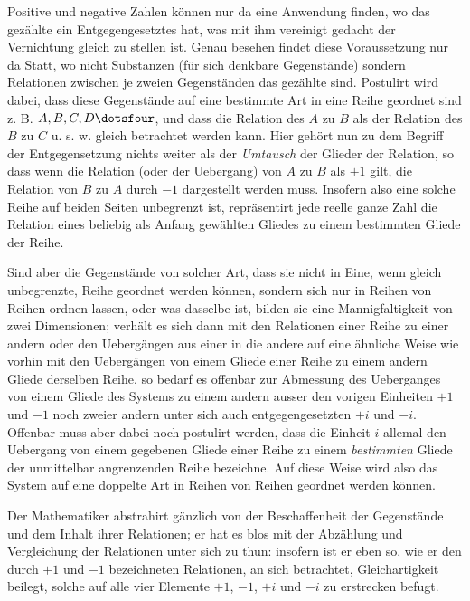 Positive und negative Zahlen können nur da eine Anwendung finden, wo
%
das gezählte ein Entgegengesetztes hat, was mit ihm vereinigt gedacht der Vernichtung gleich zu stellen ist. Genau besehen findet diese Voraussetzung nur da Statt, wo nicht Substanzen (für sich denkbare Gegenstände) sondern Relationen zwischen je zweien Gegenständen das gezählte sind. Postulirt wird dabei, dass diese Gegenstände auf eine bestimmte Art in eine Reihe geordnet sind z. B. $A,B,C,D\dotsfour$, und dass die Relation des $A$ zu $B$ als der Relation des $B$ zu $C$ u. s. w. gleich betrachtet werden kann. Hier gehört nun zu dem Begriff der Entgegensetzung nichts weiter als der \emph{Umtausch} der Glieder der Relation, so dass wenn die Relation (oder der Uebergang) von $A$ zu $B$ als $+1$ gilt, die Relation von $B$ zu $A$ durch $-1$ dargestellt werden muss. Insofern also eine solche Reihe auf beiden Seiten unbegrenzt ist, repräsentirt jede reelle ganze Zahl die Relation eines beliebig als Anfang gewählten Gliedes zu einem bestimmten Gliede der Reihe.

Sind aber die Gegenstände von solcher Art, dass sie nicht in Eine, wenn gleich unbegrenzte, Reihe geordnet werden können, sondern sich nur in Reihen von Reihen ordnen lassen, oder was dasselbe ist, bilden sie eine Mannigfaltigkeit von zwei Dimensionen; verhält es sich dann mit den Relationen einer Reihe zu einer andern oder den Uebergängen aus einer in die andere auf eine ähnliche Weise wie vorhin mit den Uebergängen von einem Gliede einer Reihe zu einem andern Gliede derselben Reihe, so bedarf es offenbar zur Abmessung des Ueberganges von einem Gliede des Systems zu einem andern ausser den vorigen Einheiten $+1$ und $-1$ noch zweier andern unter sich auch entgegengesetzten $+i$ und $-i$. Offenbar muss aber dabei noch postulirt werden, dass die Einheit $i$ allemal den Uebergang von einem gegebenen Gliede einer Reihe zu einem \emph{bestimmten} Gliede der unmittelbar angrenzenden Reihe bezeichne. Auf diese Weise wird also das System auf eine doppelte Art in Reihen von Reihen geordnet werden können.

Der Mathematiker abstrahirt gänzlich von der Beschaffenheit der Gegenstände und dem Inhalt ihrer Relationen; er hat es blos mit der Abzählung und Vergleichung der Relationen unter sich zu thun: insofern ist er eben so, wie er den durch $+1$ und $-1$ bezeichneten Relationen, an sich betrachtet, Gleichartigkeit beilegt, solche auf alle vier Elemente $+1$, $-1$, $+i$ und $-i$ zu erstrecken befugt.

